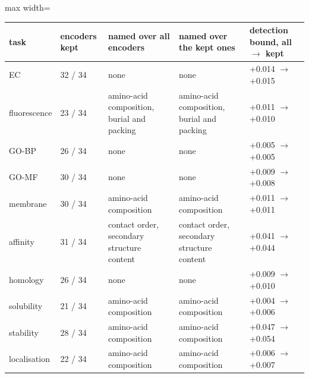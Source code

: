 \begin{adjustbox}{max width=\linewidth}
\begin{tabular}{lllll}
\toprule
\rowcolor{CompassLavender!32}
task & encoders kept & named over all encoders & named over the kept ones & detection bound, all $\to$ kept \\
\midrule
EC & 32 / 34 & none & none & +0.014 $\to$ +0.015 \\
fluorescence & 23 / 34 & amino-acid composition, burial and packing & amino-acid composition, burial and packing & +0.011 $\to$ +0.010 \\
GO-BP & 26 / 34 & none & none & +0.005 $\to$ +0.005 \\
GO-MF & 30 / 34 & none & none & +0.009 $\to$ +0.008 \\
membrane & 30 / 34 & amino-acid composition & amino-acid composition & +0.011 $\to$ +0.011 \\
affinity & 31 / 34 & contact order, secondary structure content & contact order, secondary structure content & +0.041 $\to$ +0.044 \\
homology & 26 / 34 & none & none & +0.009 $\to$ +0.010 \\
solubility & 21 / 34 & amino-acid composition & amino-acid composition & +0.004 $\to$ +0.006 \\
stability & 28 / 34 & amino-acid composition & amino-acid composition & +0.047 $\to$ +0.054 \\
localisation & 22 / 34 & amino-acid composition & amino-acid composition & +0.006 $\to$ +0.007 \\
\bottomrule
\end{tabular}
\end{adjustbox}
